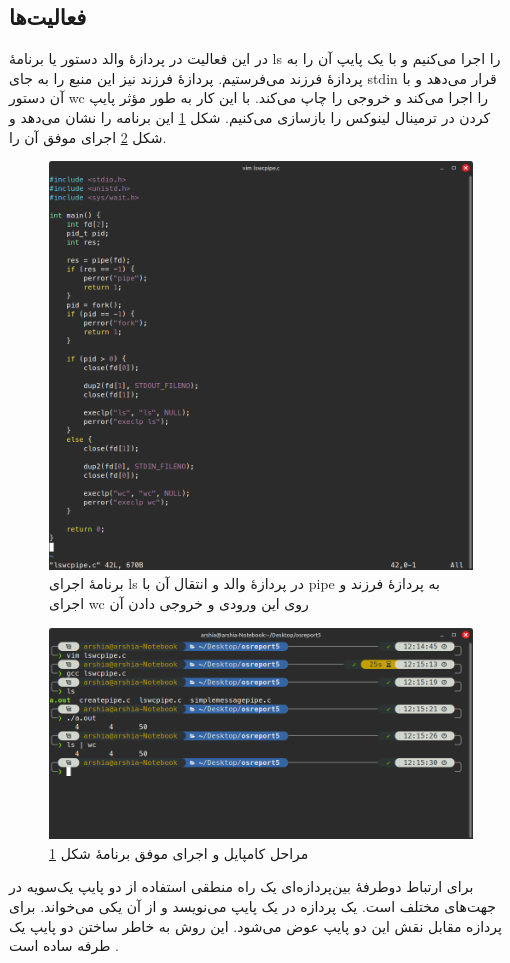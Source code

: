 \documentclass[12pt]{article}
\begin{document}
	\subsection{فعالیت‌ها}
	در این فعالیت در پردازهٔ والد دستور یا برنامهٔ ls را اجرا می‌کنیم و با یک پایپ آن را به پردازهٔ فرزند می‌فرستیم. پردازهٔ فرزند نیز این منبع را به جای stdin قرار می‌دهد و با آن دستور wc را اجرا می‌کند و خروجی را چاپ می‌کند. با این کار به طور مؤثر پایپ کردن در ترمینال لینوکس را بازسازی می‌کنیم. شکل \ref{img:6} این برنامه را نشان می‌دهد و شکل \ref{img:7} اجرای موفق آن را.
	\begin{figure}[H]
		\centering
		\includegraphics[width=\textwidth]{report5-resources/6.png}
		\caption{برنامهٔ اجرای \textenglish{ls} در پردازهٔ والد و انتقال آن با \textenglish{pipe} به پردازهٔ فرزند و اجرای \textenglish{wc} روی این ورودی و خروجی دادن آن}
		\label{img:6}
	\end{figure}
	\begin{figure}[H]
		\centering
		\includegraphics[width=\textwidth]{report5-resources/7.png}
		\caption{مراحل کامپایل و اجرای موفق برنامهٔ شکل \ref{img:6}}
		\label{img:7}
	\end{figure}
	برای ارتباط دوطرفهٔ بین‌پردازه‌ای یک راه منطقی استفاده از دو پایپ یک‌سویه در جهت‌های مختلف است. یک پردازه در یک پایپ می‌نویسد و از آن یکی می‌خواند. برای پردازه مقابل نقش این دو پایپ عوض می‌شود. این روش به خاطر ساختن دو پایپ یک طرفه ساده است \cite{a1}.
	
\end{document}
